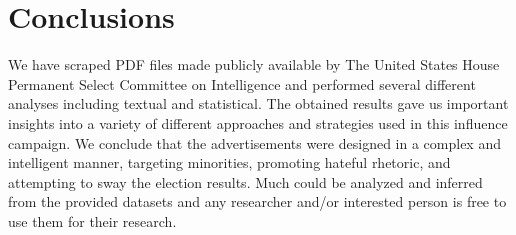 \documentclass{article}
\begin{document}

\section*{\centering Conclusions}

We have scraped PDF files made publicly available by The United States House
Permanent Select Committee on Intelligence and performed several different
analyses including textual and statistical. The obtained results gave us
important insights into a variety of different approaches and strategies used
in this influence campaign. We conclude that the advertisements were designed
in a complex and intelligent manner, targeting minorities, promoting hateful
rhetoric, and attempting to sway the election results. Much could be analyzed
and inferred from the provided datasets and any researcher and/or interested
person is free to use them for their research.


\newpage

\printbibliography%

\end{document}
